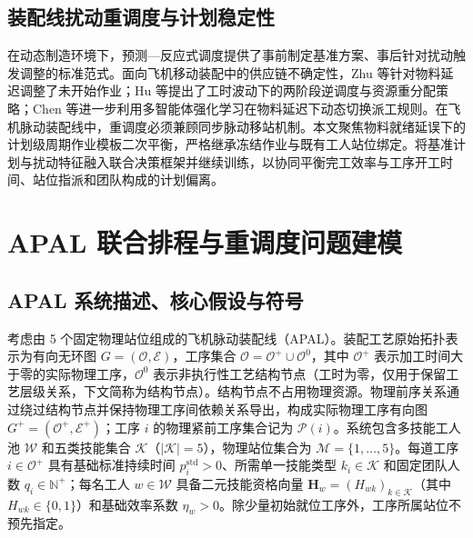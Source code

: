 \documentclass[journal,10pt]{IEEEtran}
\begin{document}
\subsection{装配线扰动重调度与计划稳定性}\label{sec:rel_resched}

在动态制造环境下，预测---反应式调度提供了事前制定基准方案、事后针对扰动触发调整的标准范式\cite{vieira2003, vonder2007}。面向飞机移动装配中的供应链不确定性，Zhu 等\cite{zhu2021}针对物料延迟调整了未开始作业；Hu 等\cite{hu2024}提出了工时波动下的两阶段逆调度与资源重分配策略；Chen 等\cite{chen2026}进一步利用多智能体强化学习在物料延迟下动态切换派工规则。在飞机脉动装配线中，重调度必须兼顾同步脉动移站机制。本文聚焦物料就绪延误下的计划级周期作业模板二次平衡，严格继承冻结作业与既有工人站位绑定。将基准计划与扰动特征融入联合决策框架并继续训练，以协同平衡完工效率与工序开工时间、站位指派和团队构成的计划偏离。

\section{APAL 联合排程与重调度问题建模}\label{sec:problem}

\subsection{APAL 系统描述、核心假设与符号}\label{sec:problem_desc}

考虑由 5 个固定物理站位组成的飞机脉动装配线（APAL）。装配工艺原始拓扑表示为有向无环图 $G=(\mathcal{O},\mathcal{E})$，工序集合 $\mathcal{O}=\mathcal{O}^{+}\cup\mathcal{O}^{0}$，其中 $\mathcal{O}^{+}$ 表示加工时间大于零的实际物理工序，$\mathcal{O}^{0}$ 表示非执行性工艺结构节点（工时为零，仅用于保留工艺层级关系，下文简称为结构节点）。结构节点不占用物理资源。物理前序关系通过绕过结构节点并保持物理工序间依赖关系导出，构成实际物理工序有向图 $G^+=(\mathcal{O}^+,\mathcal{E}^+)$；工序 $i$ 的物理紧前工序集合记为 $\mathcal{P}(i)$。系统包含多技能工人池 $\mathcal{W}$ 和五类技能集合 $\mathcal{K}$（$|\mathcal{K}|=5$），物理站位集合为 $\mathcal{M}=\{1,\dots,5\}$。每道工序 $i\in\mathcal{O}^{+}$ 具有基础标准持续时间 $p_i^{\mathrm{std}}>0$、所需单一技能类型 $k_i\in\mathcal{K}$ 和固定团队人数 $q_i\in\mathbb{N}^{+}$；每名工人 $w\in\mathcal{W}$ 具备二元技能资格向量 $\mathbf{H}_w=(H_{wk})_{k\in\mathcal{K}}$（其中 $H_{wk}\in\{0,1\}$）和基础效率系数 $\eta_w>0$。除少量初始就位工序外，工序所属站位不预先指定。
\end{document}
